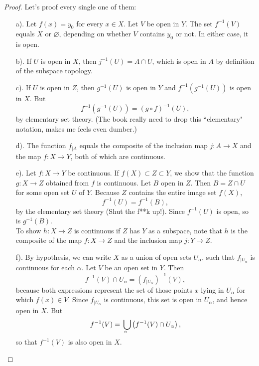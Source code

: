 \begin{proof}
Let's proof every single one of them:
\begin{enumerate}
    \item[a).] Let $f(x) =y_0$ for every $x \in X$. Let $V$ be open in $Y$. The set $f^{-1} (V)$ equals $X$ or $\varnothing$, depending on whether $V$ contains $y_0$ or not. In either case, it is open.
    \item[b).] If $U$ is open in $X$, then $j^{-1}(U) = A \cap U$, which is open in $A$ by definition of the subspace topology.
    \item[c).] If $U$ is open in $Z$, then $g^{-1}(U)$ is open in $Y$ and $f^{-1}(g^{-1}(U))$ is open in $X$. But
                $$f^{-1}(g^{-1}(U)) = \left(g \circ f\right)^{-1}(U),$$
                by elementary set theory. (The book really need to drop this ``elementary" notation, makes me feels even dumber.)
    \item[d).] The function $f_{\vert A}$ equals the composite of the inclusion map $j: A \longrightarrow X$ and the map $f: X \longrightarrow Y$, both of which are continuous.
    \item[e).] Let $f: X \longrightarrow Y$ be continuous. If $f(X) \subset Z \subset Y$, we show that the function $g: X \longrightarrow Z$ obtained from $f$ is continuous. Let $B$ open in $Z$. Then $B = Z \cap U$ for some open set $U$ of $Y$. Because $Z$ contains the entire image set $f(X)$,
                $$f^{-1}(U) = f^{-1}(B),$$
                by the elementary set theory (Shut the f**k up!). Since $f^{-1}(U)$ is open, so is $g^{-1}(B)$.\\
                To show $h: X \longrightarrow Z$ is continuous if $Z$ has $Y$ as a subspace, note that $h$ is the composite of the map $f: X \longrightarrow Z$ and the inclusion map $j: Y \longrightarrow Z$.
    \item[f).] By hypothesis, we can write $X$ as a union of open sets $U_{\alpha}$, such that $f_{\vert U_{\alpha}}$ is continuous for each $\alpha$. Let $V$ be an open set in $Y$. Then
                $$f^{-1}(V) \cap U_{\alpha} = \left(f_{\vert U_{\alpha}}\right)^{-1}(V),$$
                because both expressions represent the set of those points $x$ lying in $U_{\alpha}$ for which $f(x) \in V$. Since $f_{\vert U_{\alpha}}$ is continuous, this set is open in $U_{\alpha}$, and hence open in $X$. But
                $$f^{-1}(V) = \underaccent{\alpha}{\bigcup} \left(f^{-1}(V) \cap U_{\alpha}\right),$$
                so that $f^{-1}(V)$ is also open in $X$.
\end{enumerate}
\end{proof}

